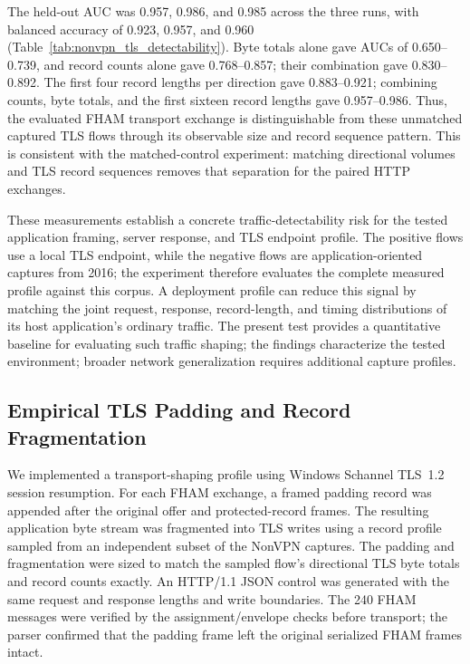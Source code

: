 \documentclass[preprint,12pt]{elsarticle}
\theoremstyle{plain}
\providecommand{\DIFaddtex}[1]{{\protect\color{blue} \sf #1}} %
\providecommand{\DIFdeltex}[1]{{\protect\color{red} \scriptsize #1}} %
\providecommand{\DIFaddbegin}{} %
\providecommand{\DIFaddend}{} %
\providecommand{\DIFdelbegin}{} %
\providecommand{\DIFdelend}{} %
\providecommand{\DIFadd}[1]{\texorpdfstring{\DIFaddtex{#1}}{#1}} %
\providecommand{\DIFdel}[1]{\texorpdfstring{\DIFdeltex{#1}}{}} %
\providecommand{\DIFscaledelfig}{0.5}
\newlength{\DIFdelgraphicswidth} %
\newlength{\DIFdelgraphicsheight} %
\providecommand{\DIFaddincludegraphics}[2][]{{\color{blue}\fbox{\DIFOincludegraphics[#1]{#2}}}} %
\providecommand{\DIFdelincludegraphics}[2][]{%
\sbox{\DIFdelgraphicsbox}{\DIFOincludegraphics[#1]{#2}}%
\settoboxwidth{\DIFdelgraphicswidth}{\DIFdelgraphicsbox} %
\settoboxtotalheight{\DIFdelgraphicsheight}{\DIFdelgraphicsbox} %
\scalebox{\DIFscaledelfig}{%
\parbox[b]{\DIFdelgraphicswidth}{\usebox{\DIFdelgraphicsbox}\\[-\baselineskip] \rule{\DIFdelgraphicswidth}{0em}}\llap{\resizebox{\DIFdelgraphicswidth}{\DIFdelgraphicsheight}{%
\setlength{\unitlength}{\DIFdelgraphicswidth}%
\begin{picture}(1,1)%
\thicklines\linethickness{2pt} %
{\color[rgb]{1,0,0}\put(0,0){\framebox(1,1){}}}%
{\color[rgb]{1,0,0}\put(0,0){\line( 1,1){1}}}%
{\color[rgb]{1,0,0}\put(0,1){\line(1,-1){1}}}%
\end{picture}%
}\hspace*{3pt}}} %
} %
\DeclareRobustCommand{\DIFaddbegin}{\DIFOaddbegin \let\includegraphics\DIFaddincludegraphics} %
\DeclareRobustCommand{\DIFaddend}{\DIFOaddend \let\includegraphics\DIFOincludegraphics} %
\DeclareRobustCommand{\DIFdelbegin}{\DIFOdelbegin \let\includegraphics\DIFdelincludegraphics} %
\DeclareRobustCommand{\DIFdelend}{\DIFOaddend \let\includegraphics\DIFOincludegraphics} %
\renewcommand{\DIFdel}[1]{}
\renewcommand{\DIFdelincludegraphics}[2][]{}
\begin{document}
The held-out AUC was 0.957, 0.986, and 0.985 across the three runs, with
balanced accuracy of 0.923, 0.957, and 0.960 (Table~\ref{tab:nonvpn_tls_detectability}).
Byte totals alone gave AUCs of 0.650--0.739, and record counts alone gave
0.768--0.857; their combination gave 0.830--0.892. The first four record
lengths per direction gave 0.883--0.921; combining counts, byte totals, and
the first sixteen record lengths gave 0.957--0.986. Thus, the evaluated FHAM transport exchange is distinguishable
from these unmatched captured TLS flows through its observable size and record
sequence pattern. This is consistent with the matched-control experiment:
matching directional volumes and TLS record sequences removes that separation
for the paired HTTP exchanges.

These measurements establish a concrete traffic-detectability risk for the
tested application framing, server response, and TLS endpoint profile. The
positive flows use a local TLS endpoint, while the negative flows are
application-oriented captures from 2016; the experiment therefore evaluates
the complete measured profile against this corpus. A deployment profile can
reduce this signal by matching the joint request, response, record-length, and
timing distributions of its host application's ordinary traffic. The present
test provides a quantitative baseline for evaluating such traffic shaping;
\DIFdelbegin \DIFdel{it does not claim generalization to every contemporary network environment}\DIFdelend \DIFaddbegin \DIFadd{the findings characterize the tested environment; broader network generalization requires additional capture profiles}\DIFaddend .

\begin{table}[H]
\centering
\scriptsize
\setlength{\tabcolsep}{3pt}
\caption{Held-out detection of FHAM TLS flows against captured NonVPN TLS traffic.}
\label{tab:nonvpn_tls_detectability}

\end{table}

\subsection{Empirical TLS Padding and Record Fragmentation}

We implemented a transport-shaping profile using Windows Schannel TLS~1.2
session resumption. For each FHAM exchange, a framed padding record was
appended after the original offer and protected-record frames. The resulting
application byte stream was fragmented into TLS writes using a record profile
sampled from an independent subset of the NonVPN captures. The padding and
fragmentation were sized to match the sampled flow's directional TLS byte
totals and record counts exactly. An HTTP/1.1 JSON control was generated with
the same request and response lengths and write boundaries. The 240 FHAM
messages were verified by the assignment/envelope checks before transport;
the parser confirmed that the padding frame left the original serialized FHAM
frames intact.
\end{document}
